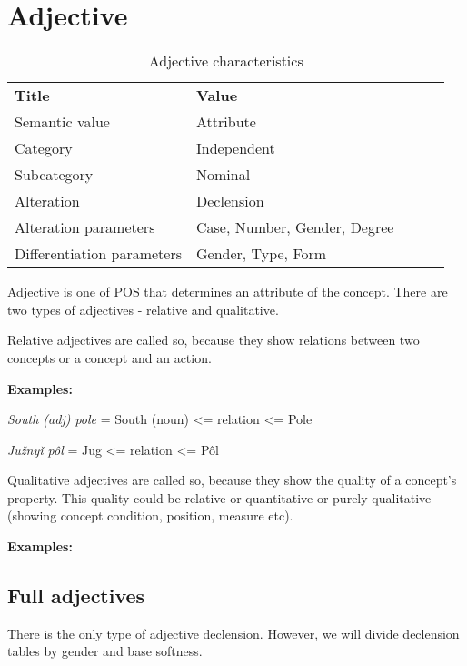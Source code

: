 \section{Adjective}

\begin{table}[h]
	\caption{Adjective characteristics}
	\begin{tabular}{lllll}
		\textbf{Title}              & \textbf{Value}               \\
		Semantic value              & Attribute                    \\
		Category                    & Independent                  \\
		Subcategory                 & Nominal                      \\
		Alteration                  & Declension                   \\
		Alteration parameters       & Case, Number, Gender, Degree \\
		Differentiation parameters  & Gender, Type, Form
	\end{tabular}
\end{table}

Adjective is one of POS that determines an attribute of the concept. There are two types of adjectives - relative and qualitative. 

Relative adjectives are called so, because they show relations between two concepts or a concept and an action.

\textbf{Examples:}

\textit{South (adj) pole} = South (noun) <= relation <= Pole

\textit{Južnyǐ pôl} = Jug <= relation <= Pôl

Qualitative adjectives are called so, because they show the quality of a concept’s property. This quality could be relative or quantitative or purely qualitative (showing concept condition, position, measure etc).

\textbf{Examples:}

\subsection{Full adjectives}

There is the only type of adjective declension. However, we will divide declension tables by gender and base softness.


